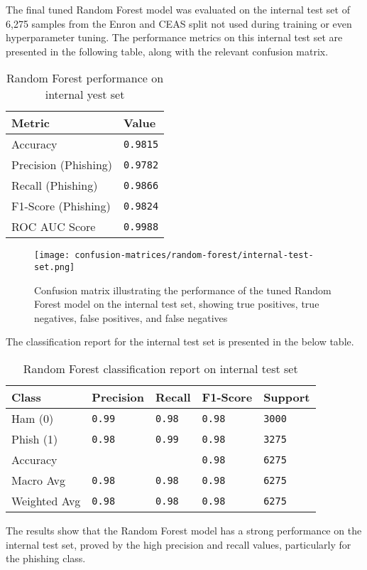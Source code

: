 \noindent The final tuned Random Forest model was evaluated on the internal test set of 6,275 samples from the Enron and CEAS split not used during training or even hyperparameter tuning. The performance metrics on this internal test set are presented in the following table, along with the relevant confusion matrix.

\begin{table}[h]
\centering
\begin{tabularx}{\textwidth}{|X|X|}
\hline
\textbf{Metric} & \textbf{Value} \\
\hline
Accuracy & \texttt{0.9815} \\
\hline
Precision (Phishing) & \texttt{0.9782} \\
\hline
Recall (Phishing) & \texttt{0.9866} \\
\hline
F1-Score (Phishing) & \texttt{0.9824} \\
\hline
ROC AUC Score & \texttt{0.9988} \\
\hline
\end{tabularx}
\caption{Random Forest performance on internal yest set}
\end{table}

\begin{figure}[H]
  \begin{center}
    \texttt{[image: confusion-matrices/random-forest/internal-test-set.png]}
    \caption{Confusion matrix illustrating the performance of the tuned Random Forest model on the internal test set, showing true positives, true negatives, false positives, and false negatives}
  \end{center}
\end{figure}

\noindent The classification report for the internal test set is presented in the below table.

\begin{table}[h]
\centering
\begin{tabularx}{\textwidth}{|X|X|X|X|X|}
\hline
\textbf{Class} & \textbf{Precision} & \textbf{Recall} & \textbf{F1-Score} & \textbf{Support} \\
\hline
Ham (0) & \texttt{0.99} & \texttt{0.98} & \texttt{0.98} & \texttt{3000} \\
\hline
Phish (1) & \texttt{0.98} & \texttt{0.99} & \texttt{0.98} & \texttt{3275} \\
\hline
Accuracy  &  &  & \texttt{0.98} & \texttt{6275} \\
\hline
Macro Avg & \texttt{0.98} & \texttt{0.98} & \texttt{0.98} & \texttt{6275} \\
\hline
Weighted Avg & \texttt{0.98} & \texttt{0.98} & \texttt{0.98} & \texttt{6275} \\
\hline
\end{tabularx}
\caption{Random Forest classification report on internal test set}
\end{table}

\noindent The results show that the Random Forest model has a strong performance on the internal test set, proved by the high precision and recall values, particularly for the phishing class.
